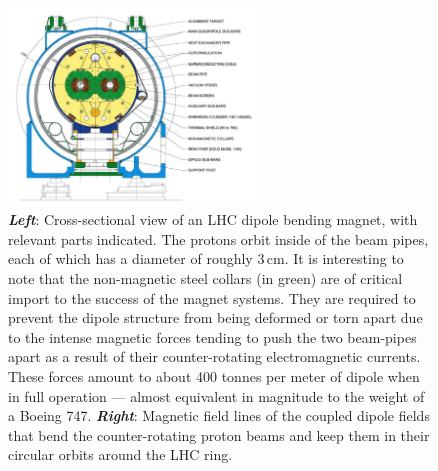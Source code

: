 \begin{figure}[!htb]
    \begin{center}
        \begin{minipage}{\textwidth}
        \includegraphics[width=0.59\textwidth]{figures/chapter2/lhc_dipole_fig3p3}
        \end{minipage}
        \caption{
            \textbf{\textit{Left}}: Cross-sectional view of an LHC dipole bending magnet, with relevant parts indicated.
            The protons orbit inside of the beam pipes, each of which has a diameter of roughly $3$\,cm.
            It is interesting to note that the non-magnetic steel collars (in green) are of critical import
            to the success of the magnet systems. They are required
            to prevent the dipole structure from being deformed or torn apart due to the intense magnetic forces
            tending to push the two beam-pipes apart as a result of their counter-rotating electromagnetic currents.
            These forces amount to about 400 tonnes per meter of dipole when in full operation --- almost equivalent in magnitude
            to the weight of a Boeing 747.
            \textbf{\textit{Right}}: Magnetic field lines of the coupled dipole fields that bend the counter-rotating proton beams
            and keep them in their circular orbits around the LHC ring.
        }
        \label{fig:lhc_dipole_xsec}
    \end{center}
\end{figure}

